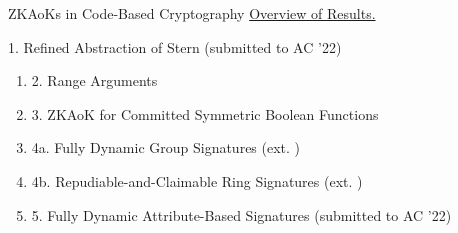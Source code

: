 \begin{frame}{ZKAoKs in Code-Based Cryptography}
	\underline{Overview of Results.}\pause
	
	{\small 1. Refined Abstraction of Stern (submitted to AC '22)}\pause
	\begin{enumerate}[$\Rightarrow$]
		\item {\small 2. Range Arguments \cite{NguyenTWZ19}}\pause
		\item {\small 3. ZKAoK for Committed Symmetric Boolean Functions \cite{LingNPTW21}}\pause
		\item {\small 4a. Fully Dynamic Group Signatures (ext. \cite{NguyenTWZ19})}\pause
		\item {\small 4b. Repudiable-and-Claimable Ring Signatures (ext. \cite{NguyenTWZ19})}\pause
		\item {\small 5. Fully Dynamic Attribute-Based Signatures (submitted to AC '22)}
	\end{enumerate}
\end{frame}